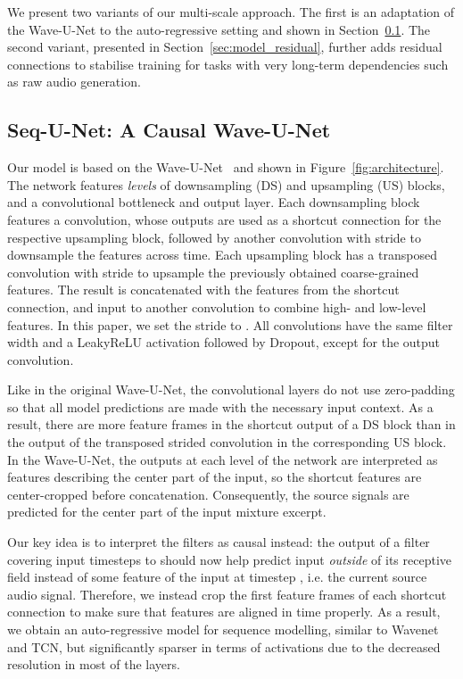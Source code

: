 \documentclass{article}
\begin{document}
We present two variants of our multi-scale approach.
The first is an adaptation of the Wave-U-Net to the auto-regressive setting and shown in Section~\ref{sec:model_waveunet}.
The second variant, presented in Section~\ref{sec:model_residual}, further adds residual connections to stabilise training for tasks with very long-term dependencies such as raw audio generation.

\subsection{Seq-U-Net: A Causal Wave-U-Net}
\label{sec:model_waveunet}

Our model is based on the Wave-U-Net~\cite{stollerWaveUNetMultiScale2018} and shown in Figure~\ref{fig:architecture}.
The network features  \emph{levels} of downsampling (DS) and upsampling (US) blocks, and a convolutional bottleneck and output layer.
Each downsampling block features a convolution, whose outputs are used as a shortcut connection for the respective upsampling block, followed by another convolution with stride  to downsample the features across time.
Each upsampling block has a transposed convolution with stride  to upsample the previously obtained coarse-grained features.
The result is concatenated with the features from the shortcut connection, and input to another convolution to combine high- and low-level features.
In this paper, we set the stride  to .
All convolutions have the same filter width and a LeakyReLU activation followed by Dropout, except for the output convolution.

Like in the original Wave-U-Net, the convolutional layers do not use zero-padding so that all model predictions are made with the necessary input context.
As a result, there are more feature frames in the shortcut output of a DS block than in the output of the transposed strided convolution in the corresponding US block.
In the Wave-U-Net, the outputs at each level of the network are interpreted as  features describing the center part of the input, so the shortcut features are center-cropped before concatenation.
Consequently, the source signals are predicted for the center part of the input mixture excerpt.

Our key idea is to interpret the filters as causal instead: the output of a filter covering input timesteps  to  should now help predict input  \emph{outside} of its receptive field instead of some feature of the input at timestep , i.e. the current source audio signal.
Therefore, we instead crop the first feature frames of each shortcut connection to make sure that features are aligned in time properly.
As a result, we obtain an auto-regressive model for sequence modelling, similar to Wavenet and TCN, but significantly sparser in terms of activations due to the decreased resolution in most of the layers.
\end{document}
